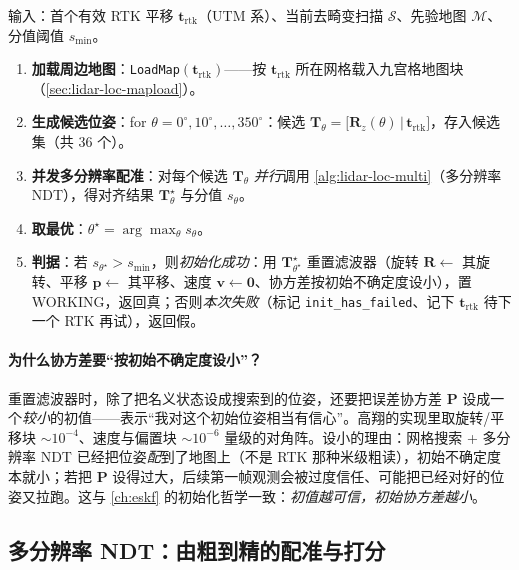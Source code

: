 \begin{algo}\label{alg:lidar-loc-search}
输入：首个有效 RTK 平移 $\mathbf t_{\mathrm{rtk}}$（UTM 系）、当前去畸变扫描 $\mathcal S$、先验地图 $\mathcal M$、分值阈值 $s_{\min}$。
\begin{enumerate}
  \item \textbf{加载周边地图}：\texttt{LoadMap}$(\mathbf t_{\mathrm{rtk}})$——按 $\mathbf t_{\mathrm{rtk}}$ 所在网格载入九宫格地图块（\cref{sec:lidar-loc-mapload}）。
  \item \textbf{生成候选位姿}：for $\theta = 0^\circ,10^\circ,\dots,350^\circ$：候选 $\mathbf T_\theta=\big[\mathbf R_z(\theta)\,\big|\,\mathbf t_{\mathrm{rtk}}\big]$，存入候选集（共 $36$ 个）。
  \item \textbf{并发多分辨率配准}：对每个候选 $\mathbf T_\theta$ \emph{并行}调用 \cref{alg:lidar-loc-multi}（多分辨率 NDT），得对齐结果 $\mathbf T_\theta^\star$ 与分值 $s_\theta$。
  \item \textbf{取最优}：$\theta^\star=\arg\max_\theta s_\theta$。
  \item \textbf{判据}：若 $s_{\theta^\star} > s_{\min}$，则\emph{初始化成功}：用 $\mathbf T_{\theta^\star}^\star$ 重置滤波器（旋转 $\mathbf R\!\leftarrow$ 其旋转、平移 $\mathbf p\!\leftarrow$ 其平移、速度 $\mathbf v\!\leftarrow\mathbf 0$、协方差按初始不确定度设小），置 \textsf{WORKING}，返回真；否则\emph{本次失败}（标记 \texttt{init\_has\_failed}、记下 $\mathbf t_{\mathrm{rtk}}$ 待下一个 RTK 再试），返回假。
\end{enumerate}
\end{algo}

\paragraph{为什么协方差要“按初始不确定度设小”？}
重置滤波器时，除了把名义状态设成搜索到的位姿，还要把误差协方差 $\mathbf P$ 设成一个\emph{较小}的初值——表示“我对这个初始位姿相当有信心”。高翔的实现里取旋转/平移块 $\sim10^{-4}$、速度与偏置块 $\sim10^{-6}$ 量级的对角阵。设小的理由：网格搜索 + 多分辨率 NDT 已经把位姿\emph{配}到了地图上（不是 RTK 那种米级粗读），初始不确定度本就小；若把 $\mathbf P$ 设得过大，后续第一帧观测会被过度信任、可能把已经对好的位姿又拉跑。这与 \cref{ch:eskf} 的初始化哲学一致：\emph{初值越可信，初始协方差越小}。

\subsection{多分辨率 NDT：由粗到精的配准与打分}
\label{sec:lidar-loc-multi}

